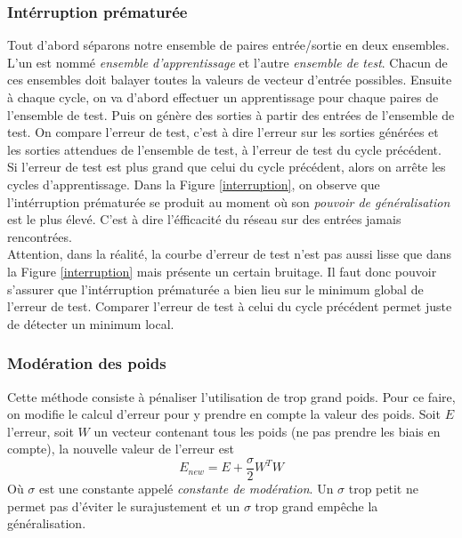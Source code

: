 \subsubsection*{Intérruption prématurée}
Tout d'abord séparons notre ensemble de paires entrée/sortie en deux ensembles.
L'un est nommé \emph{ensemble d'apprentissage} et l'autre \emph{ensemble de test}.
Chacun de ces ensembles doit balayer toutes la valeurs de vecteur d'entrée possibles.
Ensuite à chaque cycle, on va d'abord effectuer un apprentissage pour chaque paires de l'ensemble de test.
Puis on génère des sorties à partir des entrées de l'ensemble de test.
On compare l'erreur de test, c'est à dire l'erreur sur les sorties générées et les sorties attendues de l'ensemble de test, à l'erreur de test du cycle précédent.
Si l'erreur de test est plus grand que celui du cycle précédent, alors on arrête les cycles d'apprentissage.
Dans la Figure \ref{interruption}, on observe que l'intérruption prématurée se produit au moment où son \emph{pouvoir de généralisation} est le plus élevé.
C'est à dire l'éfficacité du réseau sur des entrées jamais rencontrées.\\

Attention, dans la réalité, la courbe d'erreur de test n'est pas aussi lisse que dans la Figure \ref{interruption} mais présente un certain bruitage.
Il faut donc pouvoir s'assurer que l'intérruption prématurée a bien lieu sur le minimum global de l'erreur de test.
Comparer l'erreur de test à celui du cycle précédent permet juste de détecter un minimum local.
\subsubsection*{Modération des poids}
Cette méthode consiste à pénaliser l'utilisation de trop grand poids.
Pour ce faire, on modifie le calcul d'erreur pour y prendre en compte la valeur des poids.\cite{statistica}
Soit $E$ l'erreur, soit $W$ un vecteur contenant tous les poids (ne pas prendre les biais en compte), la nouvelle valeur de l'erreur est \[E_{new} = E + \frac{\sigma}{2}W^{T}W\]
Où $\sigma$ est une constante appelé \emph{constante de modération}.
Un $\sigma$ trop petit ne permet pas d'éviter le surajustement et un $\sigma$ trop grand empêche la généralisation.